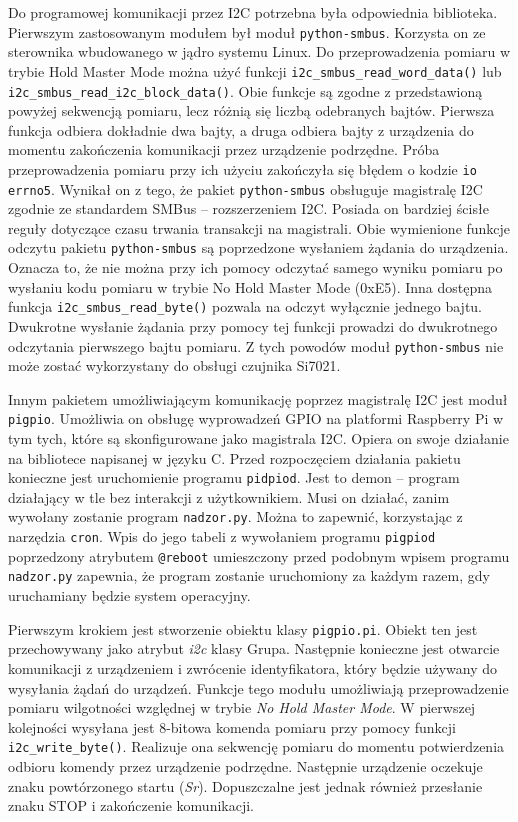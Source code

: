 \documentclass[a4paper,11pt,twoside]{article}
\begin{document}
Do programowej komunikacji przez I2C potrzebna była odpowiednia biblioteka. Pierwszym zastosowanym modułem był moduł \texttt{python-smbus}. Korzysta on ze sterownika wbudowanego w jądro systemu Linux. Do przeprowadzenia pomiaru w trybie Hold Master Mode można użyć funkcji \texttt{i2c{\_}smbus{\_}read{\_}word{\_}data()} \linebreak lub \texttt{i2c{\_}smbus{\_}read{\_}i2c{\_}block{\_}data()}. Obie funkcje są zgodne z przedstawioną powyżej sekwencją pomiaru, lecz różnią się liczbą odebranych bajtów. Pierwsza funkcja odbiera dokładnie dwa bajty, a druga odbiera bajty z urządzenia do momentu zakończenia komunikacji przez urządzenie podrzędne\cite{smbus}. Próba przeprowadzenia pomiaru przy ich użyciu zakończyła się błędem o kodzie \texttt{io errno5}. Wynikał on z tego, że pakiet \texttt{python-smbus} obsługuje magistralę I2C zgodnie ze standardem SMBus -- rozszerzeniem I2C. Posiada on bardziej ścisłe reguły dotyczące czasu trwania transakcji na magistrali. Obie wymienione funkcje odczytu pakietu \texttt{python-smbus} są poprzedzone wysłaniem żądania do urządzenia. Oznacza to, że nie można przy ich pomocy odczytać samego wyniku pomiaru po wysłaniu kodu pomiaru w trybie No Hold Master Mode (0xE5). Inna dostępna funkcja \texttt{i2c{\_}smbus{\_}read{\_}byte()} pozwala na odczyt wyłącznie jednego bajtu. Dwukrotne wysłanie żądania przy pomocy tej funkcji prowadzi do dwukrotnego odczytania pierwszego bajtu pomiaru. Z tych powodów moduł \texttt{python-smbus} nie może zostać wykorzystany do obsługi czujnika Si7021. 

Innym pakietem umożliwiającym komunikację poprzez magistralę I2C jest moduł \texttt{pigpio}. Umożliwia on obsługę wyprowadzeń GPIO na platformi Raspberry Pi w tym tych, które są skonfigurowane jako magistrala I2C. Opiera on swoje działanie na bibliotece napisanej w języku C. Przed rozpoczęciem działania pakietu konieczne jest uruchomienie programu \texttt{pidpiod}. Jest to demon -- program działający w tle bez interakcji z użytkownikiem. Musi on działać, zanim wywołany zostanie program \texttt{nadzor.py}. Można to zapewnić, korzystając z narzędzia \texttt{cron}. Wpis do jego tabeli z wywołaniem programu \texttt{pigpiod} poprzedzony atrybutem \texttt{@reboot} umieszczony przed podobnym wpisem programu \texttt{nadzor.py} zapewnia, że program zostanie uruchomiony za każdym razem, gdy uruchamiany będzie system operacyjny.

Pierwszym krokiem jest stworzenie obiektu klasy \texttt{pigpio.pi}. Obiekt ten jest przechowywany jako atrybut \textit{i2c} klasy Grupa. Następnie konieczne jest otwarcie komunikacji z urządzeniem i zwrócenie identyfikatora, który będzie używany do wysyłania żądań do urządzeń. Funkcje tego modułu umożliwiają przeprowadzenie pomiaru wilgotności względnej w trybie \textit{No Hold Master Mode}. W pierwszej kolejności wysyłana jest 8-bitowa komenda pomiaru przy pomocy funkcji \texttt{i2c{\_}write{\_}byte()}. Realizuje ona sekwencję pomiaru do momentu potwierdzenia odbioru komendy przez urządzenie podrzędne. Następnie urządzenie oczekuje znaku powtórzonego startu (\textit{Sr}). Dopuszczalne jest jednak również przesłanie znaku STOP i zakończenie komunikacji.
\end{document}
